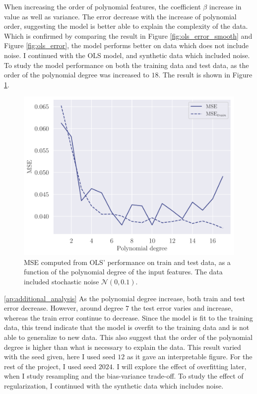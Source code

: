 When increasing the order of polynomial features, the coefficient $\beta$ increase in value as well as variance. The error decrease with the increase of polynomial order, suggesting the model is better able to explain the complexity of the data. Which is confirmed by comparing the result in Figure \ref{fig:ols_error_smooth} and Figure \ref{fig:ols_error}, the model performs better on data which does not include noise.
I continued with the OLS model, and synthetic data which included noise. To study the model performance on both the training data and test data, as the order of the polynomial degree was increased to $18$. The result is shown in Figure \ref{fig:ols_hastie}.
\begin{figure}[h]
    \centering
    \includegraphics[width=\linewidth]{project-1/latex/figures/dev-figs/ols_hastie_N50.pdf}
    \caption{MSE computed from OLS' performance on train and test data, as a function of the polynomial degree of the input features. The data included stochastic noise $\mathcal{N}(0, 0.1)$.}
    \label{fig:ols_hastie}
\end{figure}\ref{ap:additional_analysis}
As the polynomial degree increase, both train and test error decrease. However, around degree $7$ the test error varies and increase, whereas the train error continue to decrease. Since the model is fit to the training data, this trend indicate that the model is overfit to the training data and is not able to generalize to new data. This also suggest that the order of the polynomial degree is higher than what is necessary to explain the data. This result varied with the seed given, here I used seed $12$ as it gave an interpretable figure. For the rest of the project, I used seed $2024$. I will explore the effect of overfitting later, when I study resampling and the bias-variance trade-off. To study the effect of regularization, I continued with the synthetic data which includes noise.


